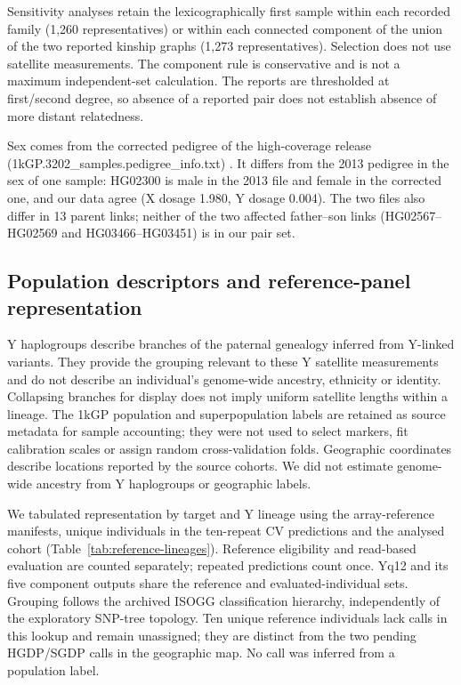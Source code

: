 \documentclass[pdflatex,sn-nature]{sn-jnl}
\begin{document}
Sensitivity analyses retain the lexicographically first sample within each recorded family (1,260 representatives) or within each connected component of the union of the two reported kinship graphs (1,273 representatives). Selection does not use satellite measurements. The component rule is conservative and is not a maximum independent-set calculation. The reports are thresholded at first/second degree, so absence of a reported pair does not establish absence of more distant relatedness.

Sex comes from the corrected pedigree of the high-coverage release (1kGP.3202\_samples.pedigree\_info.txt) \cite{ByrskaBishop2022}. It differs from the 2013 pedigree in the sex of one sample: HG02300 is male in the 2013 file and female in the corrected one, and our data agree (X dosage 1.980, Y dosage 0.004). The two files also differ in 13 parent links; neither of the two affected father--son links (HG02567--HG02569 and HG03466--HG03451) is in our pair set.

\subsection{Population descriptors and reference-panel representation}\label{sec:m-descriptors}
Y haplogroups describe branches of the paternal genealogy inferred from Y-linked variants. They provide the grouping relevant to these Y satellite measurements and do not describe an individual's genome-wide ancestry, ethnicity or identity. Collapsing branches for display does not imply uniform satellite lengths within a lineage. The 1kGP population and superpopulation labels are retained as source metadata for sample accounting; they were not used to select markers, fit calibration scales or assign random cross-validation folds. Geographic coordinates describe locations reported by the source cohorts. We did not estimate genome-wide ancestry from Y haplogroups or geographic labels.

We tabulated representation by target and Y lineage using the array-reference manifests, unique individuals in the ten-repeat CV predictions and the analysed cohort (Table~\ref{tab:reference-lineages}). Reference eligibility and read-based evaluation are counted separately; repeated predictions count once. Yq12 and its five component outputs share the reference and evaluated-individual sets. Grouping follows the archived ISOGG classification hierarchy, independently of the exploratory SNP-tree topology. Ten unique reference individuals lack calls in this lookup and remain unassigned; they are distinct from the two pending HGDP/SGDP calls in the geographic map. No call was inferred from a population label.
\end{document}
